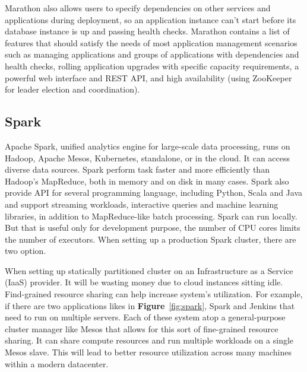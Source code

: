 \documentclass[12pt,oneside,openright,a4paper]{cpe-english-project}
\begin{document}
Marathon also allows users to specify dependencies on other services and applications during deployment, so an application instance can’t start before its database instance is up and passing health checks. Marathon contains a list of features that should satisfy the needs of most application management scenarios such as managing applications and groups of applications with dependencies and health checks, rolling application upgrades with specific capacity requirements, a powerful web interface and REST API, and high availability (using ZooKeeper for leader election and coordination).\cite{mesosInAction}

\newpage

\subsection{Spark}
Apache Spark, unified analytics engine for large-scale data processing, runs on Hadoop, Apache Mesos, Kubernetes, standalone, or in the cloud. It can access diverse data sources. Spark perform task faster and more efficiently than Hadoop’s MapReduce, both in memory and on disk in many cases. Spark also provide API for several programming language, including Python, Scala and Java and support streaming workloads, interactive queries and machine learning libraries, in addition to MapReduce-like batch processing.  Spark can run locally. But that is useful only for development purpose, the number of CPU cores limits the number of executors. When setting up a production Spark cluster, there are two option.

When setting up statically partitioned cluster on an Infrastructure as a Service (IaaS) provider. It will be wasting money due to cloud instances sitting idle. Find-grained resource sharing can help increase system’s utilization. For example, if there are two applications likes in \textbf{Figure}~\ref{fig:spark}, Spark and Jenkins that need to run on multiple servers. Each of these system atop a general-purpose cluster manager like Mesos that allows for this sort of fine-grained resource sharing. It can share compute resources and run multiple workloads on a single Mesos slave. This will lead to better resource utilization across many machines within a modern datacenter.\cite{mesosInAction}
\end{document}
